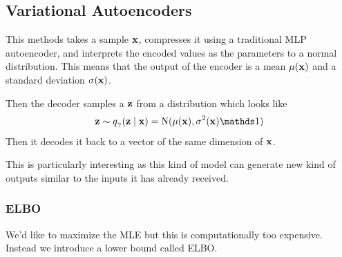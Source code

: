 \documentclass[12pt]{extarticle}
\renewcommand{\vec}[1]{\bvec{#1}}
\begin{document}
\subsection{Variational Autoencoders}

This methods takes a sample $\vec x$, compresses it using a traditional MLP autoencoder, and
interprets the encoded values as the parameters to a normal distribution.
This means that the output of the encoder is a mean $\mu(\vec x)$ and a standard deviation
$\sigma(\vec x)$.

Then the decoder samples a $\vec z$ from a distribution which looks like
\begin{equation}
	\vec z \sim q_\gamma(\vec z \mid \vec x) = \mathrm N (\mu(\vec x), \sigma^2(\vec x) \mathds 1)
\end{equation}
Then it decodes it back to a vector of the same dimension of $\vec x$.

This is particularly interesting as this kind of model can generate new kind of outputs similar to
the inputs it has already received.

\subsubsection{ELBO}

We'd like to maximize the MLE but this is computationally too expensive.
Instead we introduce a lower bound called ELBO.
\end{document}
